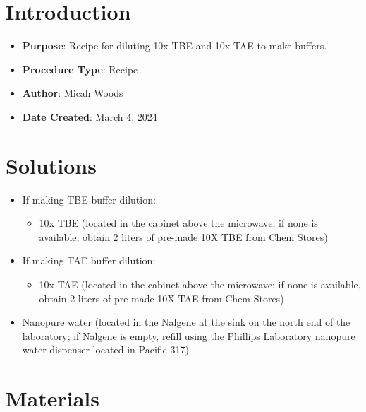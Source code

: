 \documentclass[
  letterpaper,
  DIV=11,
  numbers=noendperiod]{scrreprt}
\providecommand{\tightlist}{%
  \setlength{\itemsep}{0pt}\setlength{\parskip}{0pt}}\usepackage{longtable,booktabs,array}
\begin{document}
\hypertarget{introduction-109}{%
\section{Introduction}\label{introduction-109}}

\begin{itemize}
\tightlist
\item
  \textbf{Purpose}: Recipe for diluting 10x TBE and 10x TAE to make
  buffers.
\item
  \textbf{Procedure Type}: Recipe
\item
  \textbf{Author}: Micah Woods
\item
  \textbf{Date Created}: March 4, 2024
\end{itemize}

\hypertarget{solutions-95}{%
\section{Solutions}\label{solutions-95}}

\begin{itemize}
\tightlist
\item
  If making TBE buffer dilution:

  \begin{itemize}
  \tightlist
  \item
    10x TBE (located in the cabinet above the microwave; if none is
    available, obtain 2 liters of pre-made 10X TBE from Chem Stores)
  \end{itemize}
\item
  If making TAE buffer dilution:

  \begin{itemize}
  \tightlist
  \item
    10x TAE (located in the cabinet above the microwave; if none is
    available, obtain 2 liters of pre-made 10X TAE from Chem Stores)
  \end{itemize}
\item
  Nanopure water (located in the Nalgene at the sink on the north end of
  the laboratory; if Nalgene is empty, refill using the Phillips
  Laboratory nanopure water dispenser located in Pacific 317)
\end{itemize}

\hypertarget{materials-104}{%
\section{Materials}\label{materials-104}}
\end{document}
